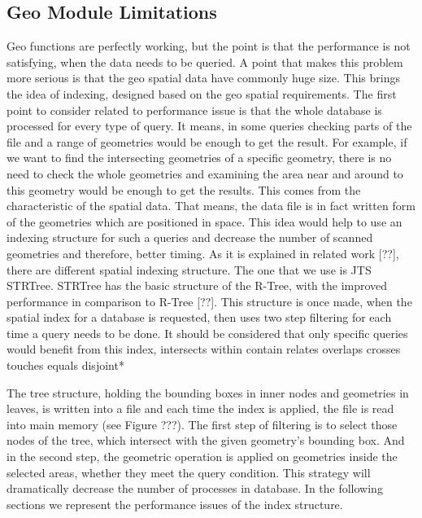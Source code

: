\documentclass[a4paper,12pt]{article}
\begin{document}
\subsection{Geo Module Limitations}
Geo functions are perfectly working, but the point is that the performance is not satisfying, when the  data needs to be queried. A point that makes this problem more serious is that the geo spatial data have commonly huge size. This brings the idea of indexing, designed based on the geo spatial requirements.
The first point to consider related to performance issue is that the whole database is processed for every type of query. It means, in some queries checking parts of the file and a range of geometries would be enough to get the result. For example, if we want to find the intersecting geometries of a specific geometry, there is no need to check the whole geometries and examining the area near and around to this geometry would be enough to get the results. This comes from the characteristic of the spatial data. That means, the data file is in fact written form of the geometries which are positioned in space. 
This idea would help to use an indexing structure for such a queries and decrease the number of scanned geometries and therefore, better timing.
As it is explained in related work [??], there are different spatial indexing structure. The one that we use is JTS STRTree. STRTree has the basic structure of the R-Tree, with the improved performance in comparison to R-Tree [??]. This structure is once made, when the spatial index for a database is requested, then uses two step filtering for each time a query needs to be done. It should be considered that only specific queries would benefit from this index,
intersects
within
contain
relates 
overlaps
crosses
touches
equals
disjoint*

The tree structure, holding the bounding boxes in inner nodes and geometries in leaves, is written into a file and each time the index is applied, the file is read into main memory (see Figure ???). The first step of filtering is to select those nodes of the tree, which intersect with the given geometry's bounding box. And in the second step, the geometric operation is applied on geometries inside the selected areas, whether they meet the query condition. This strategy will dramatically decrease the number of processes in database. In the following sections we represent the performance issues of the index structure.
\end{document}
